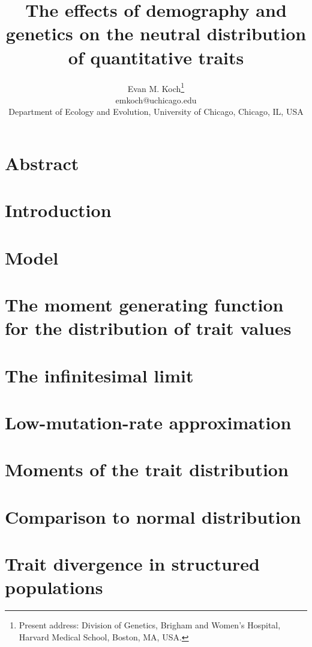 \documentclass{article}
\begin{document}
\title{The effects of demography and genetics on the neutral distribution of
  quantitative traits} \author{Evan M. Koch\footnote{Present address: Division
    of Genetics, Brigham and Women’s Hospital, Harvard Medical School, Boston,
    MA, USA.} \\ emkoch@uchicago.edu \\ Department of Ecology and Evolution,
  University of Chicago, Chicago, IL, USA} \date{} \maketitle

\section*{Abstract}

\section*{Introduction}

\section*{Model}

\section*{The moment generating function for the distribution of trait values}

\section*{The infinitesimal limit}

\section*{Low-mutation-rate approximation} \label{sec:lmr}

\section*{Moments of the trait distribution}

\section*{Comparison to normal distribution}

\section*{Trait divergence in structured populations}

\end{document}
